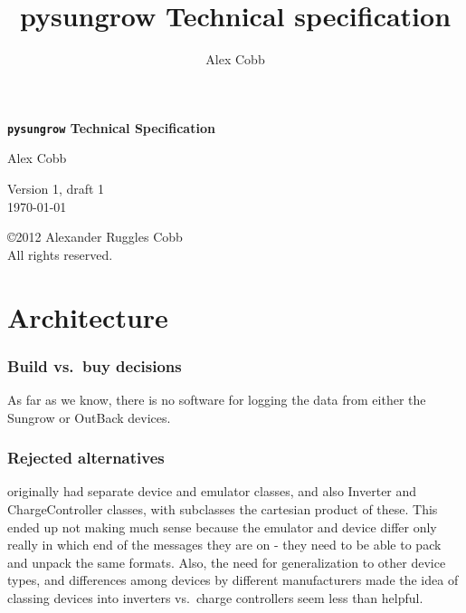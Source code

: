 \documentclass[pdftex,oneside,12pt,a4paper]{book}
\begin{document}
\title{pysungrow Technical specification}
\author{Alex Cobb}

\frontmatter


\thispagestyle{empty}


\noindent
{\center\Huge\bfseries
  \texttt{pysungrow} Technical Specification \\
}


{\center\large
  \noindent
  {\Large
  Alex Cobb \\
  }

  \vspace{4ex}

  \noindent
  {\normalsize
  Version 1, draft 1 \\
  \today \\ }
}

\pagebreak

\thispagestyle{empty}

\vspace*{0.33\textheight}
\hspace{3em}
\parbox{30em}{%
\begin{small}
  \noindent
  \copyright 2012 Alexander Ruggles Cobb \\
  All rights reserved.
\end{small}
}

\tableofcontents

\mainmatter

\chapter{Architecture}
\subsection{Build vs.\ buy decisions}
As far as we know, there is no software for logging the data from either the Sungrow or OutBack devices.

\subsection{Rejected alternatives}
originally had separate device and emulator classes, and also Inverter and ChargeController classes, with subclasses the cartesian product of these.  This ended up not making much sense because the emulator and device differ only really in which end of the messages they are on - they need to be able to pack and unpack the same formats.  Also, the need for generalization to other device types, and differences among devices by different manufacturers made the idea of classing devices into inverters vs.\ charge controllers seem less than helpful.
\end{document}

